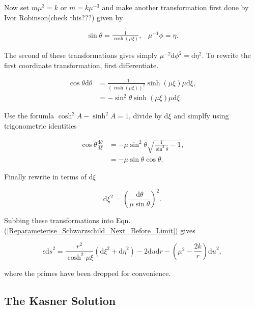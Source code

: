 \noindent Now set $m \mu^{3} = k$ or $ m = k \mu^{-3}$ and make another transformation first done by Ivor Robinson(check this???) given by

\begin{align*} 
\sin{\theta} = \frac{1}{\cosh{(\mu \xi)}}, & \mu^{-1} \phi = \eta.  
\end{align*} 

\noindent The second of these transformations gives simply $\mu^{-2} \mathrm{d}\phi^2 = \mathrm{d} \eta^2$. To rewrite the first coordinate transformation, first differentiate.

\begin{align*} 
\cos{\theta} \mathrm{d} \theta & = \frac{-1}{(\cosh(\mu \xi))^{2}} \sinh(\mu \xi) \mu \mathrm{d} \xi, \\
                      & = -{\sin}^{2}\theta \sinh(\mu \xi) \mu \mathrm{d} \xi.
\end{align*}

\noindent Use the forumla $\cosh^2 A - \sinh^2 A = 1$, divide by $\mathrm{d} \xi$ and simplfy using trigonometric identities

\begin{align*}
\cos{\theta} \frac{\mathrm{d} \theta}{\mathrm{d} \xi} & = -\mu \sin^2 \theta \sqrt{\frac{1}{\sin^2 \theta} - 1}, \\
                                    & = - \mu \sin \theta \cos \theta.
\end{align*}

\noindent Finally rewrite in terms of $\mathrm{d} \xi$

\begin{equation*}
\mathrm{d} \xi^2 = {\left( \frac{\mathrm{d} \theta}{\mu \sin \theta}  \right)}^2.
\end{equation*}

\noindent Subbing these transformations into Eqn.(\ref{Reparameterise_Schwarzschild_Next_Before_Limit}) gives

\begin{equation*}
\epsilon {\mathrm{d}s}^2 = \frac{r^2}{\cosh^{2}{\mu \xi}} ({\mathrm{d}\xi}^2 + {\mathrm{d}\eta}^2) - 2 {\mathrm{d}u}{\mathrm{d}r} - \left( \mu^{2} - \frac{2k}{r} \right) {\mathrm{d}u}^2,
\end{equation*}

\noindent where the primes have been dropped for convenience. 

\subsection{The Kasner Solution}

